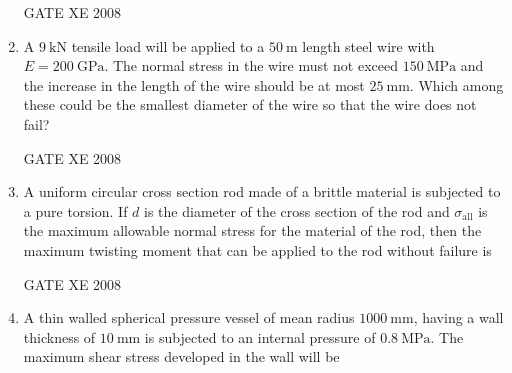 \documentclass[12pt]{article}
\begin{document}
\begin{enumerate}
GATE XE 2008  

\item A $9 \ \text{kN}$ tensile load will be applied to a $50 \ \text{m}$ length steel wire with $E = 200 \ \text{GPa}$. The normal stress in the wire must not exceed $150 \ \text{MPa}$ and the increase in the length of the wire should be at most $25 \ \text{mm}$. Which among these could be the smallest diameter of the wire so that the wire does not fail?  

\begin{enumerate}
\end{enumerate}

GATE XE 2008  

\item A uniform circular cross section rod made of a brittle material is subjected to a pure torsion. If $d$ is the diameter of the cross section of the rod and $\sigma_{\text{all}}$ is the maximum allowable normal stress for the material of the rod, then the maximum twisting moment that can be applied to the rod without failure is  

\begin{enumerate}
\end{enumerate}

GATE XE 2008  

\item A thin walled spherical pressure vessel of mean radius $1000 \ \text{mm}$, having a wall thickness of $10 \ \text{mm}$ is subjected to an internal pressure of $0.8 \ \text{MPa}$. The maximum shear stress developed in the wall will be  

\begin{enumerate}
\end{enumerate}


\end{enumerate}
\end{document}
